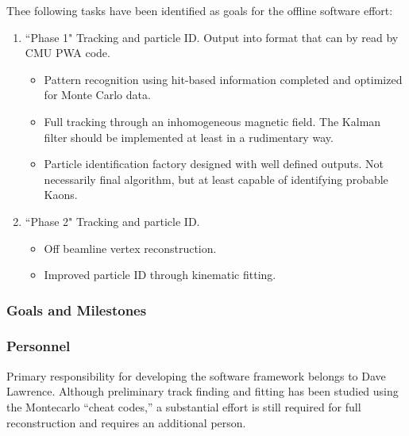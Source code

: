 \documentclass[10pt]{article}
\begin{document}
Thee following tasks have been identified as goals for the offline
software effort:

\begin{enumerate}
\item ``Phase 1" Tracking and particle ID. Output into format that can
by read by CMU PWA code.
   \begin{itemize}
    \item Pattern recognition using hit-based information completed and optimized for Monte Carlo data.
    \item Full tracking through an inhomogeneous magnetic field. The Kalman
   filter should be implemented at least in a rudimentary way.
    \item Particle identification factory designed with well defined outputs.
   Not necessarily final algorithm, but at least capable of identifying probable Kaons.
   \end{itemize}                                                                                            
\item ``Phase 2" Tracking and particle ID.
  \begin{itemize}
   \item Off beamline vertex reconstruction.
   \item Improved particle ID through kinematic fitting.
   \end{itemize}
\end{enumerate}


\subsubsection*{Goals and Milestones}


\subsubsection*{Personnel}

Primary responsibility for developing the software framework belongs to Dave Lawrence.
Although preliminary track finding and fitting has been studied using the
Montecarlo ``cheat codes,'' a substantial effort is still required for full reconstruction
and requires an additional person.
\end{document}
